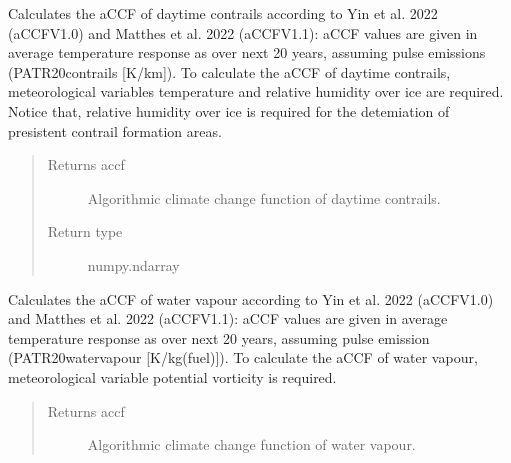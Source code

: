 \documentclass[a4paper,11pt,english]{sphinxmanual}
\begin{document}
\begin{fulllineitems}
\begin{fulllineitems}
\begin{quote}
\begin{description}
\end{description}\end{quote}

\end{fulllineitems}


\begin{fulllineitems}
\label{\detokenize{modules:envlib.accf.GeTaCCFs.accf_dcontrail}}
Calculates the aCCF of day\sphinxhyphen{}time contrails according to Yin et al. 2022 (aCCF\sphinxhyphen{}V1.0) and Matthes et al. 2022 (aCCF\sphinxhyphen{}V1.1): aCCF values are  given in average 
temperature response as over next 20 years, assuming pulse emissions (P\sphinxhyphen{}ATR20\sphinxhyphen{}contrails {[}K/km{]}). To calculate the aCCF of day\sphinxhyphen{}time contrails,
meteorological variables temperature and relative humidity over ice are required. Notice that,
relative humidity over ice is required for the detemiation of presistent contrail formation areas.
\begin{quote}\begin{description}
\item[{Returns accf}] \leavevmode
Algorithmic climate change function of day\sphinxhyphen{}time contrails.

\item[{Return type}] \leavevmode
numpy.ndarray

\end{description}\end{quote}

\end{fulllineitems}


\begin{fulllineitems}
\label{\detokenize{modules:envlib.accf.GeTaCCFs.accf_h2o}}
Calculates the aCCF of water vapour according to Yin et al. 2022 (aCCF\sphinxhyphen{}V1.0) and Matthes et al. 2022 (aCCF\sphinxhyphen{}V1.1): aCCF values are  given in average 
temperature response as over next 20 years, assuming pulse emission (P\sphinxhyphen{}ATR20\sphinxhyphen{}water\sphinxhyphen{}vapour {[}K/kg(fuel){]}). To calculate the aCCF of water vapour,
meteorological variable potential vorticity is required.
\begin{quote}\begin{description}
\item[{Returns accf}] \leavevmode
Algorithmic climate change function of water vapour.


\end{description}
\end{quote}
\end{fulllineitems}
\end{fulllineitems}
\end{document}
